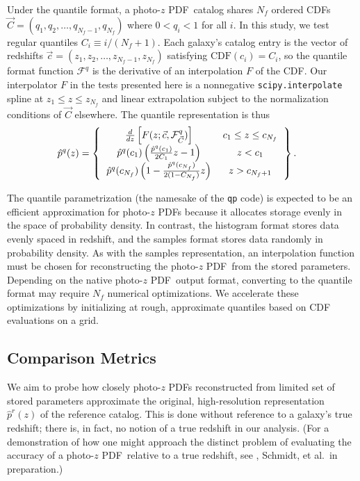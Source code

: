 \documentclass[\docopts]{\docclass}
\newcommand{\pz}{photo-$z$ PDF}
\begin{document}
Under the quantile format, a \pz\ catalog shares $N_{f}$ ordered CDFs $\vec{C} 
= (q_{1}, q_{2}, \dots, q_{N_{f}-1}, q_{N_{f}})$ where $0 < q_{i} < 1$ for all 
$i$.
In this study, we test regular quantiles $C_{i} \equiv i / (N_{f} + 1)$.
Each galaxy's catalog entry is the vector of redshifts $\vec{c} = (z_{1}, 
z_{2}, \dots, z_{N_{f}-1}, z_{N_{f}})$ satisfying $\mathrm{CDF}(c_{i}) = 
C_{i}$, so the quantile format function $\mathcal{F}^{q}$ is the derivative of 
an interpolation $F$ of the CDF.
Our interpolator $F$ in the tests presented here is a nonnegative 
\texttt{scipy.interpolate} spline at $z_{1} \leq z \leq z_{N_{f}}$ and linear 
extrapolation subject to the normalization conditions of $\vec{C}$ elsewhere.
The quantile representation is thus
\begin{align}
  \label{eq:quantiles}
  \hat{p}^{q}(z) &=
  \left\{
  \begin{tabular}{cc}
  $\frac{d}{dz} \left[F(z; \vec{c}, \mathcal{F}^{q}_{\vec{C}})\right]$ & $c_{1} 
\leq z \leq c_{N_{f}}$ \\
  $\hat{p}^{q}(c_{1})\left(\frac{\hat{p}^{q}(c_{1})}{2C_{1}} z - 1\right)$ & $z 
< c_{1}$ \\
  $\hat{p}^{q}(c_{N_{f}})\left(1 - \frac{\hat{p}^{q}(c_{N_{f}})}{2(1 - 
C_{N_{f}})} z\right)$ & $z > c_{N_{f}+1}$
  \end{tabular}
  \right\}.
\end{align}


The quantile parametrization (the namesake of the \texttt{qp} code) is expected 
to be an efficient approximation for \pz s because it allocates storage evenly 
in the space of probability density.
In contrast, the histogram format stores data evenly spaced in redshift, and 
the samples format stores data randomly in probability density.
As with the samples representation, an interpolation function must be chosen 
for reconstructing the \pz\ from the stored parameters.
Depending on the native \pz\ output format, converting to the quantile format 
may require $N_{f}$ numerical optimizations.
We accelerate these optimizations by initializing at rough, approximate 
quantiles based on CDF evaluations on a grid.





\subsection{Comparison Metrics}
\label{sec:metric}

We aim to probe how closely \pz s reconstructed from limited set of stored 
parameters approximate the original, high-resolution representation 
$\hat{p}^{r}(z)$ of the reference catalog.
This is done without reference to a galaxy's true redshift; there is, in fact, 
no notion of a true redshift in our analysis.
(For a demonstration of how one might approach the distinct problem of 
evaluating the accuracy of a \pz\ relative to a true redshift, see 
\citet{polsterer_uncertain_2016}, Schmidt, et al.\ in preparation.)
\end{document}
